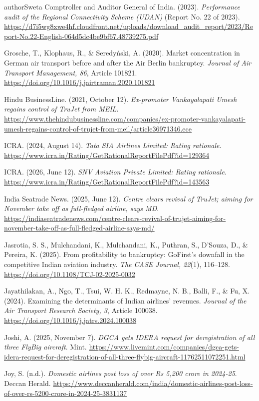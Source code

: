 \begin{mergedcontribution}{authorSweta}
Comptroller and Auditor General of India. (2023). \textit{Performance audit of the Regional Connectivity Scheme (UDAN)} (Report No. 22 of 2023). \url{https://d7i5wg8xwe4hf.cloudfront.net/uploads/download_audit_report/2023/Report-No.22-English-064d5dc4be9bf67.48739275.pdf}

Grosche, T., Klophaus, R., \& Seredy{\'n}ski, A. (2020). Market concentration in German air transport before and after the Air Berlin bankruptcy. \textit{Journal of Air Transport Management, 86}, Article 101821. \url{https://doi.org/10.1016/j.jairtraman.2020.101821}

Hindu BusinessLine. (2021, October 12). \textit{Ex-promoter Vankayalapati Umesh regains control of TruJet from MEIL}. \url{https://www.thehindubusinessline.com/companies/ex-promoter-vankayalapati-umesh-regains-control-of-trujet-from-meil/article36971346.ece}

ICRA. (2024, August 14). \textit{Tata SIA Airlines Limited: Rating rationale}. \url{https://www.icra.in/Rating/GetRationalReportFilePdf?id=129364}

ICRA. (2026, June 12). \textit{SNV Aviation Private Limited: Rating rationale}. \url{https://www.icra.in/Rating/GetRationalReportFilePdf?id=143563}

India Seatrade News. (2025, June 12). \textit{Centre clears revival of TruJet; aiming for November take off as full-fledged airline, says MD}. \url{https://indiaseatradenews.com/centre-clears-revival-of-trujet-aiming-for-november-take-off-as-full-fledged-airline-says-md/}

Jasrotia, S. S., Mulchandani, K., Mulchandani, K., Puthran, S., D'Souza, D., \& Pereira, K. (2025). From profitability to bankruptcy: GoFirst's downfall in the competitive Indian aviation industry. \textit{The CASE Journal, 22}(1), 116--128. \url{https://doi.org/10.1108/TCJ-02-2025-0032}

Jayathilakan, A., Ngo, T., Tsui, W. H. K., Redmayne, N. B., Balli, F., \& Fu, X. (2024). Examining the determinants of Indian airlines' revenues. \textit{Journal of the Air Transport Research Society, 3}, Article 100038. \url{https://doi.org/10.1016/j.jatrs.2024.100038}

Joshi, A. (2025, November 7). \textit{DGCA gets IDERA request for deregistration of all three FlyBig aircraft}. Mint. \url{https://www.livemint.com/companies/dgca-gets-idera-request-for-deregistration-of-all-three-flybig-aircraft-11762511072251.html}

Joy, S. (n.d.). \textit{Domestic airlines post loss of over Rs 5,200 crore in 2024-25}. Deccan Herald. \url{https://www.deccanherald.com/india/domestic-airlines-post-loss-of-over-rs-5200-crore-in-2024-25-3831137}


\end{mergedcontribution}
